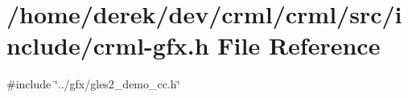 \hypertarget{crml-gfx_8h}{
\section{/home/derek/dev/crml/crml/src/include/crml-\/gfx.h File Reference}
\label{crml-gfx_8h}
}
{\ttfamily \#include \char`\"{}../gfx/gles2\_\-demo\_\-cc.h\char`\"{}}\par
